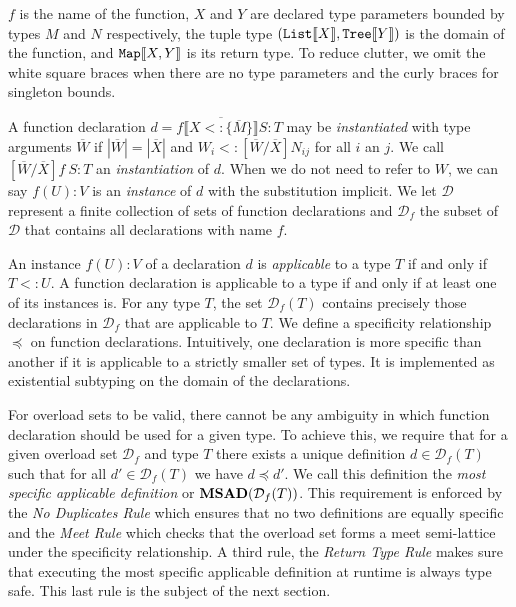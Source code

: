 \documentclass[preprint]{sigplanconf}
\newcommand{\ob}[1]{\ensuremath{\llbracket {#1} \rrbracket}}
\newcommand{\obb}[1]{\ensuremath{\llbracket \overline{#1} \rrbracket}}
\newcommand{\ms}{\preceq}
\begin{document}
\noindent $f$ is the name of the function, $X$ and $Y$ are declared type parameters bounded
by types $M$ and $N$ respectively, the tuple type $({\tt List}\ob{X},{\tt Tree}\ob{Y})$
is the domain of the function, and $ {\tt Map}\ob{X,Y}$ is its return type.  To reduce clutter, we omit
the white square braces when there are no type parameters and the curly braces for singleton bounds.

A function declaration $d=f\obb{X <: \{\overline{M}\}}S :T$ may be {\it instantiated} with type arguments
$\overline{W}$ if $|\overline{W}| = |\overline{X}|$ and $W_i <: [\overline{W}/\overline{X}]N_{ij}$ for all
$i$ an $j$.  We call $[\overline{W}/\overline{X}]f~S:T$ an {\it instantiation} of $d$.  When we do not
need to refer to $W$, we can say $f(U):V$ is an {\it instance} of $d$ with the substitution implicit.
We let $\mathcal{D}$ represent a finite collection of sets of function declarations and $\mathcal{D}_f$
the subset of $\mathcal{D}$ that contains all declarations with name $f$.

An instance $f(U):V$ of a declaration $d$ is {\it applicable} to a type $T$ if and only if $T <: U$.  A function
declaration is applicable to a type if and only if at least one of its instances is.  For any type $T$, the
set $\mathcal{D}_f(T)$ contains precisely those declarations in $\mathcal{D}_f$ that are applicable
to $T$.  We define a specificity relationship $\ms$ on function declarations.  Intuitively, one declaration
is more specific than another if it is applicable to a strictly smaller set of types.  It is implemented as
existential subtyping on the domain of the declarations.  

For overload sets to be valid, there cannot be any ambiguity in which function declaration should be
used for a given type.  To achieve this, we require that for a given overload set $\mathcal{D}_f$ and
type $T$ there exists a unique definition $d\in\mathcal{D}_f(T)$ such that for all $d'\in\mathcal{D}_f(T)$
we have $d \ms d'$.  We call this definition the {\it most specific applicable definition} or ${\bf MSAD}(\mathcal{D}_f(T))$.
This requirement is enforced by the {\it No Duplicates Rule} which ensures that no two definitions
are equally specific and the {\it Meet Rule} which checks that the overload set forms a meet semi-lattice
under the specificity relationship.  A third rule, the {\it Return Type Rule} makes sure that executing
the most specific applicable definition at runtime is always type safe.  This last rule is the subject of the 
next section.
\end{document}
